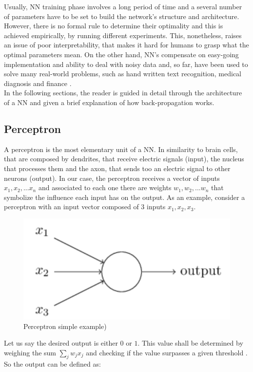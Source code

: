 Usually, NN training phase involves a long period of time and a several number of parameters have to be set to build the network's structure and architecture. However, there is no formal rule to determine their optimality and this is achieved empirically, by running different experiments. This, nonetheless, raises an issue of poor interpretability, that makes it hard for humans to grasp what the optimal parameters mean. 
On the other hand, NN's compensate on easy-going implementation and ability to deal with noisy data and, so far, have been used to solve many real-world problems, such as hand written text recognition, medical diagnosis and finance \cite{HanDataMining}.
\\

In the following sections, the reader is guided in detail through the architecture of a NN and given a brief explanation of how back-propagation works.

\subsection{Perceptron}

A perceptron is the most elementary unit of a NN. In similarity to brain cells, that are composed by dendrites, that receive electric signals (input), the nucleus that processes them and the axon, that sends too an electric signal to other neurons (output). In our case, the perceptron receives a vector of inputs ${x_1, x_2,... x_n}$ and associated to each one there are weights ${w_1,w_2,...w_n}$ that symbolize the influence each input has on the output. As an example, consider a perceptron with an input vector composed of 3 inputs ${x_1, x_2, x_3}$.

\begin{figure}[H]
	\centering
	\includegraphics[scale=0.5, width=0.35\linewidth]{figures/perceptron.png}
	\caption{Perceptron simple example)}
	\label{perceptron}
\end{figure} 

Let us say the desired output is either $0$ or $1$. This value shall be determined by weighing the sum $ \sum_j w_j x_j$ and checking if the value surpasses a given threshold \cite{nielsenneural}. So the output can be defined as: 

